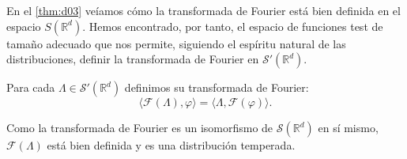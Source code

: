 En el \autoref{thm:d03} veíamos cómo la transformada de Fourier está bien definida en el espacio $S(\mathds{R}^{d})$. Hemos encontrado, por tanto, el espacio de funciones test de tamaño adecuado que nos permite, siguiendo el espíritu natural de las distribuciones, definir la transformada de Fourier en $ \mathcal{S'}(\mathds{R}^{d})$. 

\begin{definicion}
Para cada $\Lambda\in \mathcal{S'}(\mathds{R}^{d})$ definimos su transformada de Fourier:
\begin{equation}
\langle \mathcal{F}(\Lambda), \varphi\rangle = \langle \Lambda, \mathcal{F}(\varphi) \rangle.
\end{equation}
\end{definicion}

Como la transformada de Fourier es un isomorfismo de $\mathcal{S}(\mathds{R}^{d})$ en sí mismo, $\mathcal{F}(\Lambda)$ está bien definida y es una distribución temperada. 

